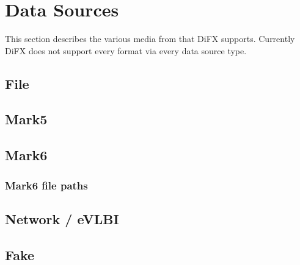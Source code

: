 
\section{Data Sources}

This section describes the various media from that DiFX supports.
Currently DiFX does not support every format via every data source type.

\subsection{File} \label{sec:filesource}

\subsection{Mark5} \label{sec:mark5source}

\subsection{Mark6} \label{sec:mark6source}

\subsubsection{Mark6 file paths} \label{sec:mark6path}

\subsection{Network / eVLBI} \label{sec:networksource}

\subsection{Fake} \label{sec:fakesource}
